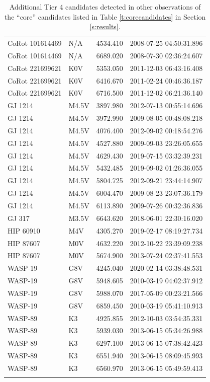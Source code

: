 \documentclass[twocolumn]{aastex701}
\begin{document}
\begin{longtable}{|l|l|l|c|}
CoRot 101614469 & N/A  & 4534.410 & 2008-07-25 04:50:31.896 \\
CoRot 101614469 & N/A & 6689.020 & 2008-07-30 02:36:24.607 \\
CoRot 221699621 & K0V & 5353.050 & 2011-12-03 06:43:16.408 \\
CoRot 221699621 & K0V & 6416.670 & 2011-02-24 00:46:36.187 \\
CoRot 221699621 & K0V & 6716.500 & 2011-12-02 06:21:36.140 \\
GJ 1214 & M4.5V & 3897.980 & 2012-07-13 00:55:14.696 \\
GJ 1214 & M4.5V & 3972.990 & 2009-08-05 00:48:08.218 \\
GJ 1214 & M4.5V & 4076.400 & 2012-09-02 00:18:54.276 \\
GJ 1214 & M4.5V & 4527.880 & 2009-09-03 23:26:05.655 \\
GJ 1214 & M4.5V & 4629.430 & 2019-07-15 03:32:39.231 \\
GJ 1214 & M4.5V & 5432.485 & 2019-09-02 01:26:36.055 \\
GJ 1214 & M4.5V & 5804.725 & 2012-09-21 23:44:14.907 \\
GJ 1214 & M4.5V & 6004.470 & 2009-08-23 23:07:36.179 \\
GJ 1214 & M4.5V & 6113.890 & 2009-07-26 00:32:36.836 \\
GJ 317 & M3.5V & 6643.620 & 2018-06-01 22:30:16.020 \\
HIP 60910 & M4V & 4305.270 & 2019-02-17 08:19:27.734 \\
HIP 87607 & M0V & 4632.220 & 2012-10-22 23:39:09.238 \\
HIP 87607 & M0V & 5674.900 & 2013-07-24 02:37:41.553 \\
WASP-19 & G8V & 4245.040 & 2020-02-14 03:38:48.531 \\
WASP-19 & G8V & 5948.605 & 2010-03-19 04:02:37.912 \\
WASP-19 & G8V & 5988.070 & 2017-05-09 00:23:21.566 \\
WASP-19 & G8V & 6859.450 & 2010-03-19 05:41:10.913 \\
WASP-89 & K3 & 4925.855 & 2012-10-03 03:54:35.331 \\
WASP-89 & K3 & 5939.030 & 2013-06-15 05:34:26.988 \\
WASP-89 & K3 & 6297.100 & 2013-06-15 07:38:42.423 \\
WASP-89 & K3 & 6551.940 & 2013-06-15 08:09:45.993 \\
WASP-89 & K3 & 6560.970 & 2013-06-15 05:49:59.413 \\
\hline
\caption{Additional Tier 4 candidates detected in other observations of the \enquote{core} candidates listed in Table \ref{t:corecandidates} in Section \ref{s:results}.} \label{t:tier4additional} \\
\end{longtable}
\onecolumngrid
\clearpage
\end{document}
